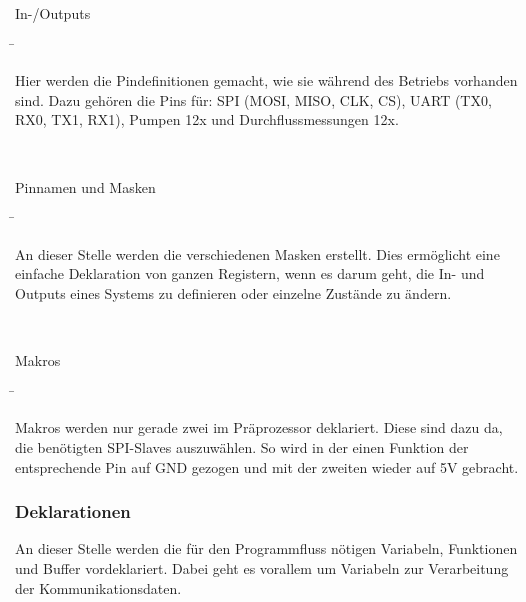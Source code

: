 \begin{tabbing}
\parbox[t]{.3\textwidth}{

In-/Outputs

} \=\parbox[t]{.7\textwidth}{

Hier werden die Pindefinitionen gemacht, wie sie während des Betriebs vorhanden sind. Dazu gehören die Pins für: SPI (MOSI, MISO, CLK, CS), UART (TX0, RX0, TX1, RX1), Pumpen 12x und Durchflussmessungen 12x.
\\

}\\
\parbox[t]{.3\textwidth}{

Pinnamen und Masken

} \=\parbox[t]{.7\textwidth}{

An dieser Stelle werden die verschiedenen Masken erstellt. Dies ermöglicht eine einfache Deklaration von ganzen Registern, wenn es darum geht, die In- und Outputs eines Systems zu definieren oder einzelne Zustände zu ändern. 
\\

}\\

\parbox[t]{.3\textwidth}{

Makros

} \=\parbox[t]{.7\textwidth}{

Makros werden nur gerade zwei im Präprozessor deklariert. Diese sind dazu da, die benötigten SPI-Slaves auszuwählen. So wird in der einen Funktion der entsprechende Pin auf GND gezogen und mit der zweiten wieder auf 5V gebracht.

}

\end{tabbing}

\subsubsection{Deklarationen}\label{subsubsec:Deklarationen}

An dieser Stelle werden die für den Programmfluss nötigen Variabeln, Funktionen und Buffer vordeklariert. Dabei geht es vorallem um Variabeln zur Verarbeitung der Kommunikationsdaten.

